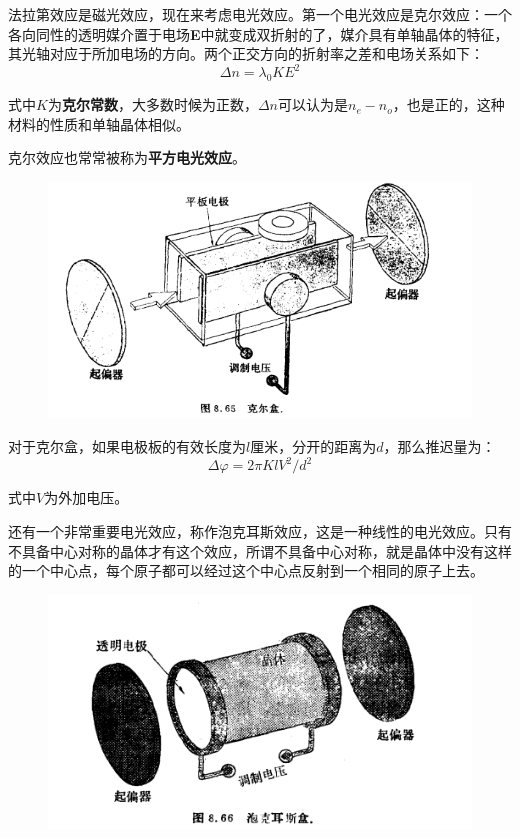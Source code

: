 \documentclass[UTF8]{ctexart}
\begin{document}
	法拉第效应是磁光效应，现在来考虑电光效应。第一个电光效应是克尔效应：一个各向同性的透明媒介置于电场\textbf{E}中就变成双折射的了，媒介具有单轴晶体的特征，其光轴对应于所加电场的方向。两个正交方向的折射率之差和电场关系如下：
	\begin{equation}
	\Delta n=\lambda_{0} K E^{2}
	\end{equation}
	
	\noindent 式中$K$为\textbf{克尔常数}，大多数时候为正数，$\Delta n$可以认为是$n_{e}-n_{o}$，也是正的，这种材料的性质和单轴晶体相似。
	
	克尔效应也常常被称为\textbf{平方电光效应}。
	\begin{figure}[h]
		\centering
		\includegraphics[width=12cm]{KeerBox.png}
	\end{figure}

	对于克尔盒，如果电极板的有效长度为$l$厘米，分开的距离为$d$，那么推迟量为：
	\begin{equation}
	\Delta \varphi=2 \pi K l V^{2} / d^{2}
	\end{equation}
	
	\noindent 式中$V$为外加电压。
	
	还有一个非常重要电光效应，称作泡克耳斯效应，这是一种线性的电光效应。只有不具备中心对称的晶体才有这个效应，所谓不具备中心对称，就是晶体中没有这样的一个中心点，每个原子都可以经过这个中心点反射到一个相同的原子上去。
	\begin{figure}[h]
		\centering
		\includegraphics[width=12cm]{PKEBox.png}
	\end{figure}
\end{document}
